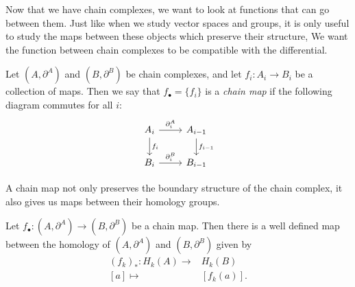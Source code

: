 Now that we have chain complexes, we want to look at functions that can go between them. Just like when we study vector spaces and groups, it is only useful to study the maps between these objects which preserve their structure, We want the function between chain complexes to be compatible with the differential.
\begin{definition} \label{def:chainmap} Let $( A,\partial^A)$ and $( B, \partial^B)$ be chain complexes, and let $f_i:A_i\to B_i$ be a collection of maps. Then we say that $f_\bullet=\{f_i\}$ is a \emph{chain map} if the following diagram commutes for all $i$:
\[\begin{tikzcd}A_i\arrow{r}{\partial_i^A}\arrow{d}{f_i}&A_{i-1}\arrow{d}{f_{i-1}}\\ B_i\arrow{r}{\partial_i^B} &B_{i-1} 
\end{tikzcd}\] \end{definition} 
A chain map not only preserves the boundary structure of the chain complex, it also gives us maps between their homology groups. 
\begin{claim}
Let $f_\bullet:(A, \partial^A)\to (B, \partial^B)$ be a chain map. Then there is a well defined map between the homology of $(A, \partial^A)$ and $(B, \partial^B)$ given by 
\begin{align*}
(f_k)_*: H_k(A)\to& H_k(B)\\
[a]\mapsto& [f_k(a)]. 
\end{align*}
\end{claim}
